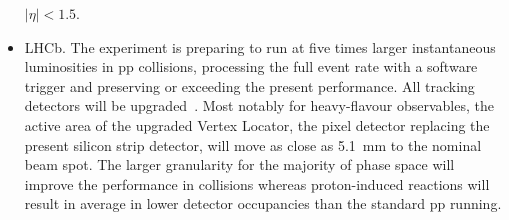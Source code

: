 \begin{itemize}
$|\eta|<1.5$. 
\item  LHCb. The experiment is preparing to run at five times larger instantaneous luminosities in pp collisions, processing the full event rate with a software trigger and preserving or exceeding the present performance.
All tracking detectors will be upgraded~\cite{Collaboration:1624070,Collaboration:1647400}. 
Most notably for heavy-flavour observables, the active area of the upgraded Vertex Locator, the pixel detector replacing the present silicon strip detector, will move as close as 5.1~mm to the nominal beam spot.
The larger granularity for the majority of phase space will improve the performance in \PbPb collisions whereas proton-induced reactions will result in average in lower detector occupancies than the standard pp running.  
\end{itemize}
